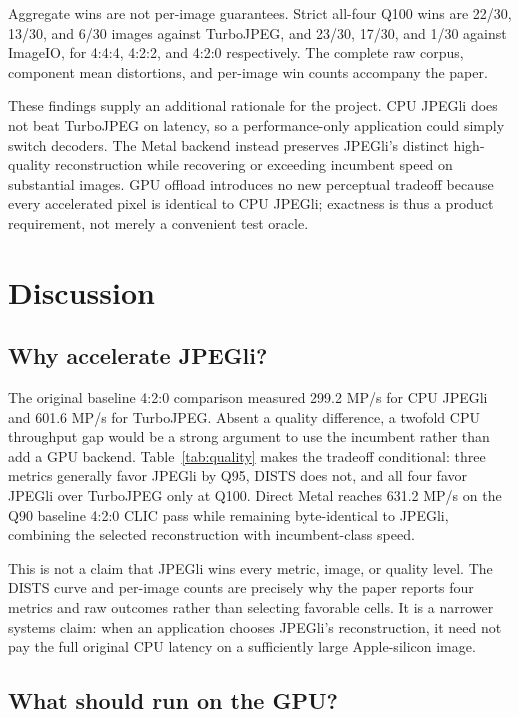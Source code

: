 \documentclass[10pt,twocolumn]{article}
\begin{document}
Aggregate wins are not per-image guarantees.  Strict all-four Q100 wins are
22/30, 13/30, and 6/30 images against TurboJPEG, and 23/30, 17/30, and 1/30
against ImageIO, for 4:4:4, 4:2:2, and 4:2:0 respectively.  The complete raw
corpus, component mean distortions, and per-image win counts accompany the
paper.

These findings supply an additional rationale for the project.  CPU JPEGli
does not beat TurboJPEG on latency, so a performance-only application could
simply switch decoders.  The Metal backend instead preserves JPEGli's distinct
high-quality reconstruction while recovering or exceeding incumbent speed on
substantial images.  GPU offload introduces no new perceptual tradeoff because
every accelerated pixel is identical to CPU JPEGli; exactness is thus a
product requirement, not merely a convenient test oracle.

\section{Discussion}

\subsection{Why accelerate JPEGli?}

The original baseline 4:2:0 comparison measured 299.2 MP/s for CPU JPEGli and
601.6 MP/s for TurboJPEG.  Absent a quality difference, a twofold CPU
throughput gap would be a strong argument to use the incumbent rather than add
a GPU backend.  Table~\ref{tab:quality} makes the tradeoff conditional: three
metrics generally favor JPEGli by Q95, DISTS does not, and all four favor
JPEGli over TurboJPEG only at Q100.  Direct Metal reaches 631.2 MP/s on the
Q90 baseline 4:2:0 CLIC pass while remaining byte-identical to JPEGli,
combining the selected reconstruction with incumbent-class speed.

This is not a claim that JPEGli wins every metric, image, or quality level.
The DISTS curve and per-image counts are precisely why the paper reports four
metrics and raw outcomes rather than selecting favorable cells.  It is a
narrower systems claim: when an application chooses JPEGli's reconstruction,
it need not pay the full original CPU latency on a sufficiently large
Apple-silicon image.

\subsection{What should run on the GPU?}
\end{document}
